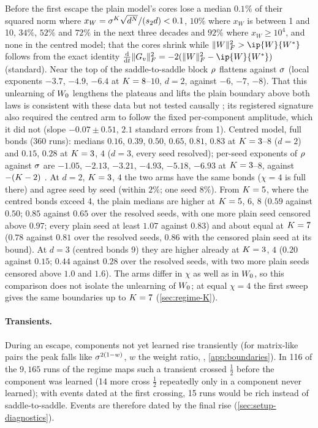 Before the first escape the plain model's cores lose a median $0.1\%$ of their squared norm where
$x_W=\sigma^K\sqrt{d^N}/(s_{2}d)<0.1$, $10\%$ where $x_W$ is between 1 and 10, $34\%$, $52\%$ and $72\%$ in the next
three decades and $92\%$ where $x_W\ge10^4$, and none in the centred model; that the cores shrink while
$\normF{\W}^2>\ip{\W}{\Wt}$ follows from the exact identity $\ddt\normF{\G v}^2=-2(\normF{\W}^2-\ip{\W}{\Wt})$
\proven{} (standard). Near the top of the saddle-to-saddle block $\rho_{}$ flattens against $\sigma$ (local exponents
$-3.7$, $-4.9$, $-6.4$ at $K=8$--$10$, $d=2$, against $-6$, $-7$, $-8$). That this unlearning of $W_{0}$ lengthens the
plateaus and lifts the plain boundary above both laws is consistent with these data but not tested causally
\conjecture; its registered signature also required the centred arm to follow the fixed per-component amplitude,
which it did not (slope $-0.07\pm0.51$, $2.1$ standard errors from 1). Centred model, full bonds (360 runs): medians
$0.16$, $0.39$, $0.50$, $0.65$, $0.81$, $0.83$ at $K=3$--$8$ ($d=2$) and $0.15$, $0.28$ at $K=3$, $4$ ($d=3$, every seed
resolved); per-seed exponents of $\rho_{}$ against $\sigma$ are $-1.05$, $-2.13$, $-3.21$, $-4.93$, $-5.18$, $-6.93$ at
$K=3$--$8$, against $-(K-2)$ . At $d=2$, $K=3$, $4$ the two arms have the
same bonds ($\chi=4$ is full there) and agree seed by seed (within $2\%$; one seed $8\%$). From $K=5$, where the centred
bonds exceed 4, the plain medians are higher at $K=5$, $6$, $8$ ($0.59$ against $0.50$; $0.85$ against $0.65$ over the
resolved seeds, with one more plain seed censored above $0.97$; every plain seed at least $1.07$ against $0.83$) and about
equal at $K=7$ ($0.78$ against $0.81$ over the resolved seeds, $0.86$ with the censored plain seed at its bound). At
$d=3$ (centred bonds 9) they are higher already at $K=3$, $4$ ($0.20$ against $0.15$; $0.44$ against $0.28$ over the
resolved seeds, with two more plain seeds censored above $1.0$ and $1.6$). The arms differ in $\chi$ as well as in $W_{0}$,
so this comparison does not isolate the unlearning of $W_{0}$; at equal $\chi=4$ the first sweep gives the same
boundaries up to $K=7$ (\cref{sec:regime-K}).

\paragraph{Transients.}
\empirical{} During an escape, components not yet learned rise transiently (for matrix-like pairs the peak falls
like $\sigma^{2(1-w)}$, $w$ the weight ratio, \conjecture, \cref{app:boundaries}). In 116 of the $9{,}165$ runs of the
regime maps such a transient crossed $\frac12$ before the component was learned (14 more cross $\frac12$ repeatedly
only in a component never learned); with events dated at the first crossing, 15 runs would be rich instead of
saddle-to-saddle. Events are therefore dated by the final rise (\cref{sec:setup-diagnostics}).

